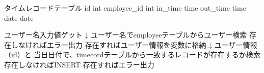 タイムレコードテーブル
id int
employee_id int
in_time time
out_time time
date date

ユーザー名入力値ゲット
↓
ユーザー名でemployeeテーブルからユーザー検索
存在しなければエラー出力
存在すればユーザー情報を変数に格納
↓
ユーザー情報（id）と 当日日付で、timecordテーブルから一致するレコードが存在するか検索
存在しなければINSERT
存在すればエラー出力